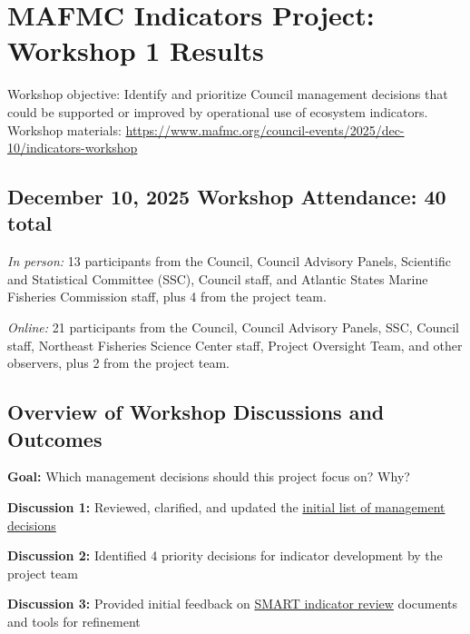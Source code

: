 \documentclass[
]{article}
\author{}
\date{\vspace{-2.5em}}
\begin{document}
\vspace{-1cm}

\section{MAFMC Indicators Project: Workshop 1
Results}\label{mafmc-indicators-project-workshop-1-results}

Workshop objective: Identify and prioritize Council management decisions
that could be supported or improved by operational use of ecosystem
indicators. Workshop materials:
\url{https://www.mafmc.org/council-events/2025/dec-10/indicators-workshop}

\subsection{December 10, 2025 Workshop Attendance: 40
total}\label{december-10-2025-workshop-attendance-40-total}

\begin{noteblock}
\emph{In person:} 13 participants from the Council, Council Advisory
Panels, Scientific and Statistical Committee (SSC), Council staff, and
Atlantic States Marine Fisheries Commission staff, plus 4 from the
project team.

\emph{Online:} 21 participants from the Council, Council Advisory
Panels, SSC, Council staff, Northeast Fisheries Science Center staff,
Project Oversight Team, and other observers, plus 2 from the project
team.

\end{noteblock}

\begin{ltgreenbox}

\subsection{Overview of Workshop Discussions and
Outcomes}\label{overview-of-workshop-discussions-and-outcomes}

\textbf{Goal:} Which management decisions should this project focus on?
Why?

\textbf{Discussion 1:} Reviewed, clarified, and updated the
\href{https://www.mafmc.org/s/3_WK1_MgtDecisions.pdf}{initial list of
management decisions}

\textbf{Discussion 2:} Identified 4 priority decisions for indicator
development by the project team

\textbf{Discussion 3:} Provided initial feedback on
\href{https://mafmc.github.io/SMARTindicatorsData/}{SMART indicator
review} documents and tools for refinement

\end{ltgreenbox}
\end{document}
